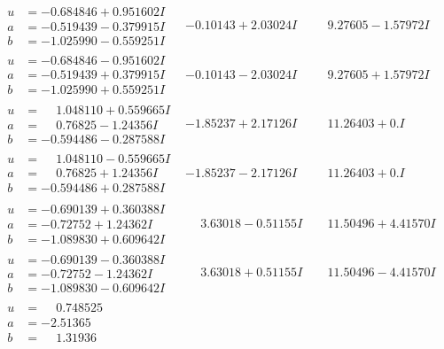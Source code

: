 \documentclass[1p]{elsarticle_modified}
\theoremstyle{definition}
\begin{document}
$$\begin{array}{c|c|c}
\begin{aligned}
u &= -0.684846 + 0.951602 I \\
a &= -0.519439 - 0.379915 I \\
b &= -1.025990 - 0.559251 I\end{aligned}
 & -0.10143 + 2.03024 I & \phantom{-}9.27605 - 1.57972 I \\ \hline\begin{aligned}
u &= -0.684846 - 0.951602 I \\
a &= -0.519439 + 0.379915 I \\
b &= -1.025990 + 0.559251 I\end{aligned}
 & -0.10143 - 2.03024 I & \phantom{-}9.27605 + 1.57972 I \\ \hline\begin{aligned}
u &= \phantom{-}1.048110 + 0.559665 I \\
a &= \phantom{-}0.76825 - 1.24356 I \\
b &= -0.594486 - 0.287588 I\end{aligned}
 & -1.85237 + 2.17126 I & \phantom{-}11.26403 + 0. I\phantom{ +0.000000I} \\ \hline\begin{aligned}
u &= \phantom{-}1.048110 - 0.559665 I \\
a &= \phantom{-}0.76825 + 1.24356 I \\
b &= -0.594486 + 0.287588 I\end{aligned}
 & -1.85237 - 2.17126 I & \phantom{-}11.26403 + 0. I\phantom{ +0.000000I} \\ \hline\begin{aligned}
u &= -0.690139 + 0.360388 I \\
a &= -0.72752 + 1.24362 I \\
b &= -1.089830 + 0.609642 I\end{aligned}
 & \phantom{-}3.63018 - 0.51155 I & \phantom{-}11.50496 + 4.41570 I \\ \hline\begin{aligned}
u &= -0.690139 - 0.360388 I \\
a &= -0.72752 - 1.24362 I \\
b &= -1.089830 - 0.609642 I\end{aligned}
 & \phantom{-}3.63018 + 0.51155 I & \phantom{-}11.50496 - 4.41570 I \\ \hline\begin{aligned}
u &= \phantom{-}0.748525\phantom{ +0.000000I} \\
a &= -2.51365\phantom{ +0.000000I} \\
b &= \phantom{-}1.31936\phantom{ +0.000000I}\end{aligned}

\end{array}$$
\end{document}
